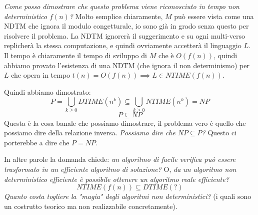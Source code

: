 \documentclass{article}
\begin{document}
\textit{Come posso dimostrare che questo problema viene riconosciuto in
tempo non deterministico $f(n)$?} Molto semplice chiaramente, $M$ può
essere vista come una NDTM che ignora il modulo congetturale, io sono già in grado
senza questo per risolvere il problema. La NDTM ignorerà il suggerimento e su ogni
multi-verso replicherà la stessa computazione, e quindi ovviamente accetterà il linguaggio
$L$. Il tempo è chiaramente il tempo di sviluppo di $M$ che è $O(f(n))$, quindi
abbiamo provato l'esistenza di una NDTM (che ignora il non
determinismo) per $L$ che opera in tempo $t(n)=O(f(n))\implies L\in NTIME(f(n))$.

Quindi abbiamo dimostrato:
$$P=\bigcup_{k\geq 0}DTIME(n^k)\subseteq \bigcup_{k\geq 0}NTIME(n^k)=NP$$
$$P\subseteq NP$$
Questa è la cosa banale che possiamo dimostrare, il problema vero è quello che possiamo dire
della relazione inversa. \textit{Possiamo dire che $NP\subseteq P$?} Questo ci porterebbe
a dire che $P=NP$.

In altre parole la domanda chiede: \textit{un algoritmo di facile verifica può
essere trasformato in un efficiente algoritmo di soluzione?} O, \textit{da un algoritmo
non deterministico efficiente è possibile ottenere un algoritmo
reale efficiente?}
$$NTIME(f(n))\subseteq DTIME(?)$$
\textit{Quanto costa togliere la "magia" degli algoritmi
non deterministici?} (i quali sono un costrutto teorico ma non realizzabile concretamente).
\end{document}
